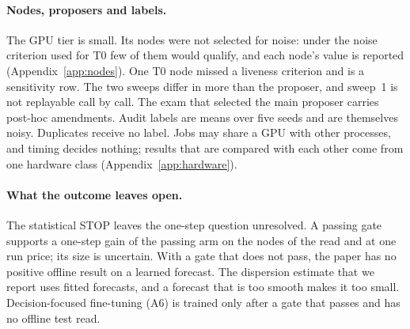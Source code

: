 \paragraph{Nodes, proposers and labels.}
The GPU tier is small. Its nodes were not selected for noise: under the noise criterion used for T0 few of them would qualify, and each node's value is reported (Appendix~\ref{app:nodes}). One T0 node missed a liveness criterion and is a sensitivity row. The two sweeps differ in more than the proposer, and sweep~1 is not replayable call by call. The exam that selected the main proposer carries post-hoc amendments. Audit labels are means over five seeds and are themselves noisy. Duplicates receive no label. Jobs may share a GPU with other processes, and timing decides nothing; results that are compared with each other come from one hardware class (Appendix~\ref{app:hardware}).

\paragraph{What the outcome leaves open.}
\ifGateStopped
The statistical STOP leaves the one-step question unresolved.
\else
\ifGatePassed
A passing gate supports a one-step gain of the passing arm on the nodes of the read and at one run price; its size is uncertain.
\else
With a gate that does not pass, the paper has no positive offline result on a learned forecast. The dispersion estimate that we report uses fitted forecasts, and a forecast that is too smooth makes it too small.
\fi
\fi
Decision-focused fine-tuning (A6) is trained only after a gate that passes and has no offline test read.
